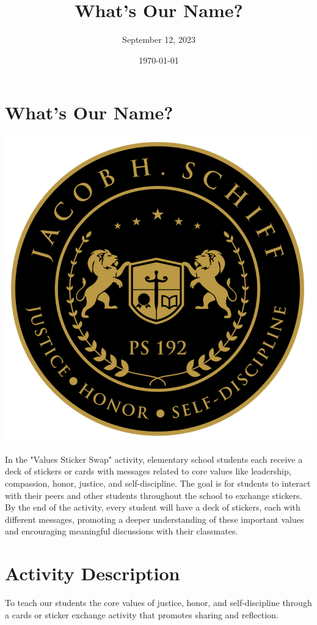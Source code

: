 \documentclass[11pt]{article}
\author{September 12, 2023}
\date{\today}
\title{What's Our Name?}
\begin{document}
\maketitle
\tableofcontents


\section{What's Our Name?}
\label{sec:org9ffa02e}
\begin{center}
\includegraphics[width=.9\linewidth]{./logo.png}
\end{center}

In the "Values Sticker Swap" activity, elementary school students each receive a deck
of stickers or cards with messages related to core values like leadership, compassion,
honor, justice, and self-discipline. The goal is for students to interact with their
peers and other students throughout the school to exchange stickers. By the end of the
activity, every student will have a deck of stickers, each with different messages,
promoting a deeper understanding of these important values and encouraging meaningful
discussions with their classmates.

\section{Activity Description}
\label{sec:orgc918388}
To teach our students the core values of justice, honor, and self-discipline through a cards or sticker exchange activity that promotes sharing and reflection.
\end{document}
